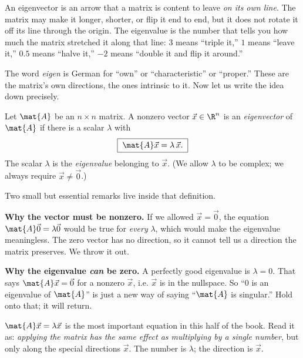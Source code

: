 \begin{intuitionbox}
An eigenvector is an arrow that a matrix is content to leave \emph{on its own
line}. The matrix may make it longer, shorter, or flip it end to end, but it does
not rotate it off its line through the origin. The eigenvalue is the number that
tells you how much the matrix stretched it along that line: $3$ means ``triple
it,'' $1$ means ``leave it,'' $0.5$ means ``halve it,'' $-2$ means ``double it and
flip it around.''
\end{intuitionbox}

The word \emph{eigen} is German for ``own'' or ``characteristic'' or ``proper.''
These are the matrix's own directions, the ones intrinsic to it. Now let us write
the idea down precisely.

\begin{definition}
\label{ch23:def-eigen}
Let $\mat{A}$ be an $n\times n$ matrix. A nonzero vector $\vec{x}\in\R^n$ is an
\emph{eigenvector} of $\mat{A}$ if there is a scalar $\lambda$ with
\[
  \boxed{\;\mat{A}\vec{x}=\lambda\,\vec{x}.\;}
\]
The scalar $\lambda$ is the \emph{eigenvalue} belonging to $\vec{x}$. (We allow
$\lambda$ to be complex; we always require $\vec{x}\neq\vec{0}$.)
\end{definition}

Two small but essential remarks live inside that definition.

\textbf{Why the vector must be nonzero.} If we allowed $\vec{x}=\vec{0}$, the
equation $\mat{A}\vec{0}=\lambda\vec{0}$ would be true for \emph{every} $\lambda$,
which would make the eigenvalue meaningless. The zero vector has no direction, so
it cannot tell us a direction the matrix preserves. We throw it out.

\textbf{Why the eigenvalue \emph{can} be zero.} A perfectly good eigenvalue is
$\lambda=0$. That says $\mat{A}\vec{x}=\vec{0}$ for a nonzero $\vec{x}$, i.e.
$\vec{x}$ is in the nullspace. So ``$0$ is an eigenvalue of $\mat{A}$'' is just a
new way of saying ``$\mat{A}$ is singular.'' Hold onto that; it will return.

\begin{focusbox}
$\mat{A}\vec{x}=\lambda\vec{x}$ is the most important equation in this half of the
book. Read it as: \emph{applying the matrix has the same effect as multiplying by
a single number}, but only along the special directions $\vec{x}$. The number is
$\lambda$; the direction is $\vec{x}$.
\end{focusbox}

